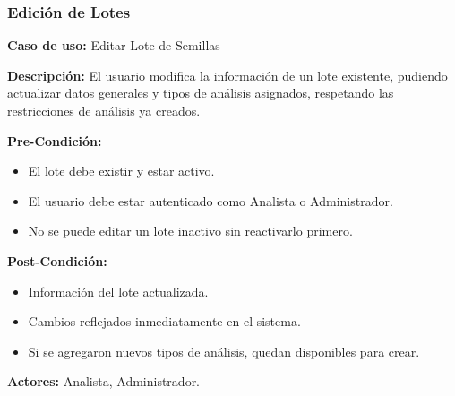 \subsubsection{Edición de Lotes}

\noindent\textbf{Caso de uso:} Editar Lote de Semillas

\vspace{0.5em}
\noindent\textbf{Descripción:} El usuario modifica la información de un lote existente, pudiendo actualizar datos generales y tipos de análisis asignados, respetando las restricciones de análisis ya creados.

\vspace{0.5em}
\noindent\textbf{Pre-Condición:}
\begin{itemize}[nosep]
    \item El lote debe existir y estar activo.
    \item El usuario debe estar autenticado como Analista o Administrador.
    \item No se puede editar un lote inactivo sin reactivarlo primero.
\end{itemize}

\vspace{0.5em}
\noindent\textbf{Post-Condición:}
\begin{itemize}[nosep]
    \item Información del lote actualizada.
    \item Cambios reflejados inmediatamente en el sistema.
    \item Si se agregaron nuevos tipos de análisis, quedan disponibles para crear.
\end{itemize}

\vspace{0.5em}
\noindent\textbf{Actores:} Analista, Administrador.

